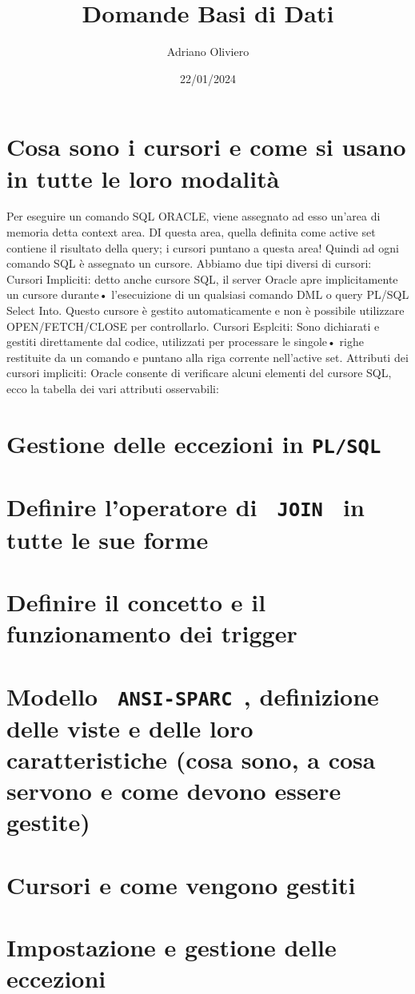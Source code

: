 \documentclass{article}
\title{Domande Basi di Dati}
\author{Adriano Oliviero}
\date{22/01/2024}
\begin{document}
\renewcommand*\contentsname{Indice}
\tableofcontents
\newpage
\section{Cosa sono i cursori e come si usano in tutte le loro modalità}
Per eseguire un comando SQL ORACLE, viene assegnato ad esso un’area di memoria detta context
area.
DI questa area, quella definita come active set contiene il risultato della query; i cursori puntano a
questa area! Quindi ad ogni comando SQL è assegnato un cursore.
Abbiamo due tipi diversi di cursori:
Cursori Impliciti: detto anche cursore SQL, il server Oracle apre implicitamente un cursore durante•
l’esecuizione di un qualsiasi comando DML o query PL/SQL Select Into. Questo cursore è gestito
automaticamente e non è possibile utilizzare OPEN/FETCH/CLOSE per controllarlo.
Cursori Esplciti: Sono dichiarati e gestiti direttamente dal codice, utilizzati per processare le singole•
righe restituite da un comando e puntano alla riga corrente nell’active set.
Attributi dei cursori impliciti:
Oracle consente di verificare alcuni elementi del cursore SQL, ecco la tabella dei vari attributi
osservabili:
\newpage
\section{Gestione delle eccezioni in \protect\texttt{PL/SQL}}
\newpage
\section{Definire l'operatore di \protect\texttt{ JOIN } in tutte le sue forme}
\newpage
\section{Definire il concetto e il funzionamento dei trigger}
\newpage
\section{Modello \protect\texttt{ ANSI-SPARC }, definizione delle viste e delle loro caratteristiche (cosa sono, a cosa servono e come devono essere gestite)}
\newpage
\section{Cursori e come vengono gestiti}
\newpage
\section{Impostazione e gestione delle eccezioni}
\newpage
\end{document}

